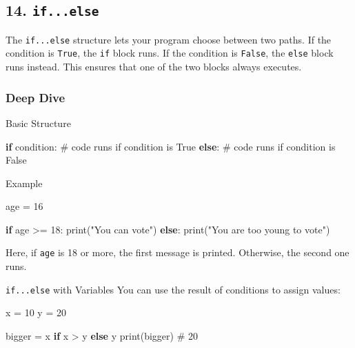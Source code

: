 \documentclass[
  letterpaper,
  DIV=11,
  numbers=noendperiod]{scrreprt}
\newenvironment{Shaded}{\begin{snugshade}}{\end{snugshade}}
\newcommand{\BuiltInTok}[1]{\textcolor[rgb]{0.00,0.23,0.31}{#1}}
\newcommand{\CommentTok}[1]{\textcolor[rgb]{0.37,0.37,0.37}{#1}}
\newcommand{\ControlFlowTok}[1]{\textcolor[rgb]{0.00,0.23,0.31}{\textbf{#1}}}
\newcommand{\DecValTok}[1]{\textcolor[rgb]{0.68,0.00,0.00}{#1}}
\newcommand{\NormalTok}[1]{\textcolor[rgb]{0.00,0.23,0.31}{#1}}
\newcommand{\OperatorTok}[1]{\textcolor[rgb]{0.37,0.37,0.37}{#1}}
\newcommand{\StringTok}[1]{\textcolor[rgb]{0.13,0.47,0.30}{#1}}
\begin{document}
\subsection{\texorpdfstring{14.
\texttt{if...else}}{14. if...else}}\label{if...else}

The \texttt{if...else} structure lets your program choose between two
paths. If the condition is \texttt{True}, the \texttt{if} block runs. If
the condition is \texttt{False}, the \texttt{else} block runs instead.
This ensures that one of the two blocks always executes.

\subsubsection{Deep Dive}\label{deep-dive-14}

Basic Structure

\begin{Shaded}
\begin{Highlighting}[]
\ControlFlowTok{if}\NormalTok{ condition:}
    \CommentTok{\# code runs if condition is True}
\ControlFlowTok{else}\NormalTok{:}
    \CommentTok{\# code runs if condition is False}
\end{Highlighting}
\end{Shaded}

Example

\begin{Shaded}
\begin{Highlighting}[]
\NormalTok{age }\OperatorTok{=} \DecValTok{16}

\ControlFlowTok{if}\NormalTok{ age }\OperatorTok{\textgreater{}=} \DecValTok{18}\NormalTok{:}
    \BuiltInTok{print}\NormalTok{(}\StringTok{"You can vote"}\NormalTok{)}
\ControlFlowTok{else}\NormalTok{:}
    \BuiltInTok{print}\NormalTok{(}\StringTok{"You are too young to vote"}\NormalTok{)}
\end{Highlighting}
\end{Shaded}

Here, if \texttt{age} is 18 or more, the first message is printed.
Otherwise, the second one runs.

\texttt{if...else} with Variables You can use the result of conditions
to assign values:

\begin{Shaded}
\begin{Highlighting}[]
\NormalTok{x }\OperatorTok{=} \DecValTok{10}
\NormalTok{y }\OperatorTok{=} \DecValTok{20}

\NormalTok{bigger }\OperatorTok{=}\NormalTok{ x }\ControlFlowTok{if}\NormalTok{ x }\OperatorTok{\textgreater{}}\NormalTok{ y }\ControlFlowTok{else}\NormalTok{ y}
\BuiltInTok{print}\NormalTok{(bigger)   }\CommentTok{\# 20}
\end{Highlighting}
\end{Shaded}
\end{document}
